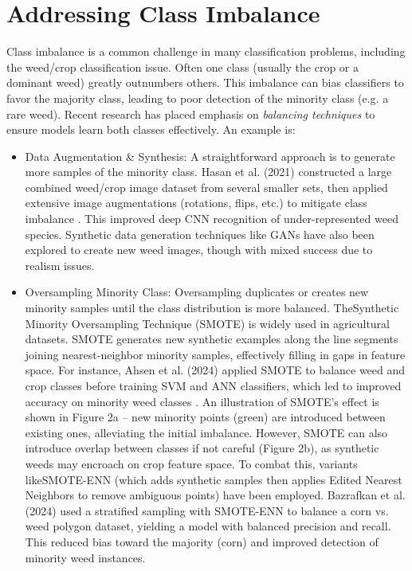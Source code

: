 \documentclass[letterpaper]{report}
\begin{document}
\section{Addressing Class Imbalance}  
Class imbalance is a common challenge in many classification problems, including the weed/crop classification issue. Often one class (usually the crop or a dominant weed) greatly outnumbers others. This imbalance can bias classifiers to favor the majority class, leading to poor detection of the minority class (e.g. a rare weed). Recent research \parencite{Wang2021-dh} has placed emphasis on \textit{balancing techniques} to ensure models learn both classes effectively. An example is:  

\begin{itemize}
	\item{Data Augmentation \& Synthesis: A straightforward approach is to generate more samples of the minority class. Hasan et al. (2021) constructed a large combined weed/crop image dataset from several smaller sets, then applied extensive image augmentations (rotations, flips, etc.) to mitigate class imbalance \parencite{Mahmudul-Hasan2023-ap}. This improved deep CNN recognition of under-represented weed species. Synthetic data generation techniques like GANs have also been explored to create new weed images, though with mixed success due to realism issues. } 

	\item{Oversampling Minority Class: Oversampling duplicates or creates new minority samples until the class distribution is more balanced. TheSynthetic Minority Oversampling Technique (SMOTE) is widely used  in agricultural datasets. SMOTE generates new synthetic examples along the line segments joining nearest-neighbor minority samples, effectively filling in gaps in feature space. For instance, Ahsen et al. (2024) applied SMOTE to balance weed and crop classes before training SVM and ANN classifiers, which led to improved accuracy on minority weed classes \parencite{Ahsen2024-dm}. An illustration of SMOTE’s effect is shown in Figure 2a – new minority points (green) are introduced between existing ones, alleviating the initial imbalance. However, SMOTE can also introduce overlap between classes if not careful (Figure 2b), as synthetic weeds may encroach on crop feature space. To combat this, variants likeSMOTE-ENN (which adds synthetic samples then applies Edited Nearest Neighbors to remove ambiguous points) have been employed. Bazrafkan et al. (2024) used a stratified sampling with SMOTE-ENN to balance a corn vs. weed polygon dataset, yielding a model with balanced precision and recall. This reduced bias toward the majority (corn) and improved detection of minority weed instances.  }


\end{itemize}
\end{document}
